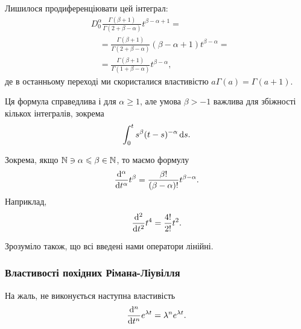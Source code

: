 Лишилося продиференціювати  цей інтеграл:
\begin{equation}
    \begin{aligned}
        & D_0^\alpha \frac{\Gamma(\beta + 1)}{\Gamma(2 + \beta - \alpha)} t^{\beta - \alpha + 1} = \\
        &\quad = \frac{\Gamma(\beta + 1)}{\Gamma(2 + \beta - \alpha)} (\beta - \alpha + 1) t^{\beta - \alpha} = \\
        &\quad = \frac{\Gamma(\beta + 1)}{\Gamma(1 + \beta - \alpha)} t^{\beta - \alpha},
    \end{aligned}
\end{equation}
де в останньому переході ми скористалися властивістю $a \Gamma(a) = \Gamma(a + 1)$.

\begin{remark}
    Ця формула справедлива і для $\alpha \ge 1$, але умова $\beta > -1$ важлива для збіжності кількох інтегралів, зокрема
    \begin{equation}
        \int_0^t s^\beta (t- s)^{-\alpha} \mathop{}\!\mathrm{d} s.
    \end{equation}
\end{remark}

\begin{example}
    Зокрема, якщо $\mathbb{N} \ni \alpha \leqslant \beta \in \mathbb{N}$, то маємо формулу
    \begin{equation}
        \frac{\mathop{}\!\mathrm{d}^\alpha}{\mathop{}\!\mathrm{d} t^\alpha} t^\beta = \frac{\beta!}{(\beta - \alpha)!} t^{\beta - \alpha}.
    \end{equation}
    Наприклад,
    \begin{equation}
        \frac{\mathop{}\!\mathrm{d}^2}{\mathop{}\!\mathrm{d} t^2} t^4 = \frac{4!}{2!} t^2.
    \end{equation}
\end{example}

\begin{remark}
    Зрозуміло також, що всі введені нами оператори лінійні.
\end{remark}

\subsubsection{Властивості похідних Рімана-Ліувілля}

\begin{proposition}
    На жаль, не виконується наступна властивість
    \begin{equation}
        \frac{\mathop{}\!\mathrm{d}^n}{\mathop{}\!\mathrm{d} t^n} e^{\lambda t} = \lambda^n e^{\lambda t}.
    \end{equation}
\end{proposition}

